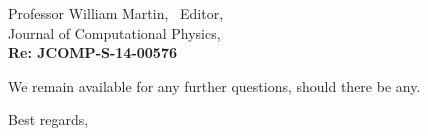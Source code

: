 \begin{letter}{Professor William Martin, \  Editor,\\
    Journal of Computational Physics,\\
\textbf{Re: JCOMP-S-14-00576}}
\bigskip

We remain available for any further questions, should there be any.
\vspace{0.25cm}



\closing{Best regards, }

\end{letter}



